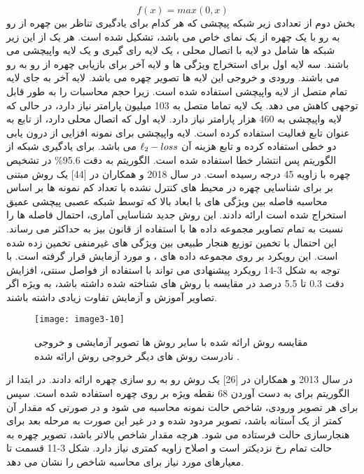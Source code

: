 \begin{equation}\label{eq2-10}
f(x)=max(0,x)
\end{equation}
\noindent
بخش دوم از تعدادی زیر شبکه پیچشی که هر کدام برای یادگیری تناظر بین چهره از رو به رو با یک چهره از یک نمای خاص می باشد، تشکیل شده است. هر یک از این زیر شبکه ها شامل دو لایه با اتصال محلی ، یک لایه رای گیری و یک لایه واپیچشی می باشند. سه لایه اول برای استخراج ویژگی ها و لایه آخر برای بازیابی چهره از رو به رو می باشند. ورودی و خروجی این لایه ها تصویر چهره می باشد. لایه آخر به جای لایه تمام متصل از لایه واپیچشی استفاده شده است. زیرا حجم محاسبات را به طور قابل توجهی کاهش می دهد. یک لایه تماما متصل به 103 میلیون پارامتر نیاز دارد، در حالی که لایه واپیچشی به 460 هزار پارامتر نیاز دارد. لایه اول که اتصال محلی دارد، از تابع  به عنوان تابع فعالیت استفاده کرده است. لایه واپیچشی برای نمونه افزایی از درون یابی دو خطی استفاده کرده و تابع هزینه آن
$\ell\textsubscript{2}-loss$
می باشد. برای یادگیری شبکه از الگوریتم پس انتشار خطا استفاده شده است. الگوریتم  به دقت 95.6\% در تشخیص چهره با زاویه 45 درجه رسیده است.
\noindent
در سال 2018  و همکاران در [44] یک روش مبتنی بر  برای شناسایی چهره در محیط های کنترل نشده با تعداد کم نمونه ها بر اساس محاسبه فاصله بین ویژگی های با ابعاد بالا که توسط شبکه عصبی پیچشی عمیق استخراج شده است ارائه دادند. این روش جدید شناسایی آماری، احتمال فاصله ها را نسبت به تمام تصاویر مجموعه داده ها با استفاده از قانون بیز  به حداکثر می رساند. این احتمال با تخمین توزیع هنجار طبیعی  بین ویژگی های غیرمنفی تخمین زده شده است. این رویکرد بر روی مجموعه داده های
،
و
مورد آزمایش قرار گرفته است. با توجه به شکل 3-14 رویکرد پیشنهادی می تواند با استفاده از فواصل سنتی، افزایش دقت 0.3 تا 5.5 درصد در مقایسه با روش های شناخته شده داشته باشد، به ویژه اگر تصاویر آموزش و آزمایش تفاوت زیادی داشته باشند. 
 \begin{figure}[h]
\centering
  \texttt{[image: image3-10]}
  \caption{مقایسه روش ارائه شده با سایر روش ها  تصویر آزمایشی  و  خروجی نادرست روش های دیگر  خروجی روش ارائه شده \cite{ref1}.}
  \label{image2-1}
\end{figure}
\noindent
در سال 2013  و همکاران در [26] یک روش رو به رو سازی چهره ارائه دادند. در ابتدا از الگوریتم  برای به دست آوردن 68 نقطه ویژه بر روی چهره استفاده شده است. سپس برای هر تصویر ورودی، شاخص حالت نمونه  محاسبه می شود و در صورتی که مقدار آن کمتر از یک آستانه باشد، تصویر مردود شده و در غیر این صورت به مرحله بعد برای هنجارسازی حالت فرستاده می شود. هرچه مقدار شاخص  بالاتر باشد، تصویر چهره به حالت تمام رخ نزدیکتر است و اصلاح زاویه کمتری نیاز دارد. شکل 3-11 قسمت  تا  معیارهای مورد نیاز برای محاسبه شاخص  را نشان می دهد.
